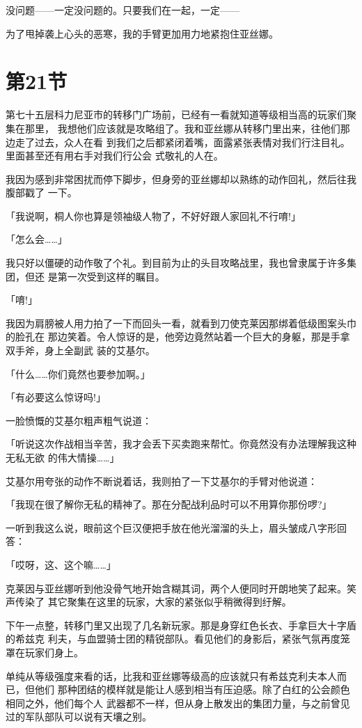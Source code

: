 \documentclass[11pt]{book}
\begin{document}
没问题——一定没问题的。只要我们在一起，一定——

为了甩掉袭上心头的恶寒，我的手臂更加用力地紧抱住亚丝娜。
\section{第21节}
\label{sec:org65d4620}
第七十五层科力尼亚市的转移门广场前，已经有一看就知道等级相当高的玩家们聚集在那里，
我想他们应该就是攻略组了。我和亚丝娜从转移门里出来，往他们那边走了过去，众人在看
到我们之后都紧闭着嘴，面露紧张表情对我们行注目礼。里面甚至还有用右手对我们行公会
式敬礼的人在。

我因为感到非常困扰而停下脚步，但身旁的亚丝娜却以熟练的动作回礼，然后往我腹部戳了
一下。

「我说啊，桐人你也算是领袖级人物了，不好好跟人家回礼不行唷!」

「怎么会……」

我只好以僵硬的动作敬了个礼。到目前为止的头目攻略战里，我也曾隶属于许多集团，但还
是第一次受到这样的瞩目。

「唷!」

我因为肩膀被人用力拍了一下而回头一看，就看到刀使克莱因那绑着低级图案头巾的脸孔在
那边笑着。令人惊讶的是，他旁边竟然站着一个巨大的身躯，那是手拿双手斧，身上全副武
装的艾基尔。

「什么……你们竟然也要参加啊。」

「有必要这么惊讶吗!」

一脸愤慨的艾基尔粗声粗气说道：

「听说这次作战相当辛苦，我才会丢下买卖跑来帮忙。你竟然没有办法理解我这种无私无欲
的伟大情操……」

艾基尔用夸张的动作不断说着话，我则拍了一下艾基尔的手臂对他说道：

「我现在很了解你无私的精神了。那在分配战利品时可以不用算你那份啰?」

一听到我这么说，眼前这个巨汉便把手放在他光溜溜的头上，眉头皱成八字形回答：

「哎呀，这、这个嘛……」

克莱因与亚丝娜听到他没骨气地开始含糊其词，两个人便同时开朗地笑了起来。笑声传染了
其它聚集在这里的玩家，大家的紧张似乎稍微得到纡解。

下午一点整，转移门里又出现了几名新玩家。那是身穿红色长衣、手拿巨大十字盾的希兹克
利夫，与血盟骑士团的精锐部队。看见他们的身影后，紧张气氛再度笼罩在玩家们身上。

单纯从等级强度来看的话，比我和亚丝娜等级高的应该就只有希兹克利夫本人而已，但他们
那种团结的模样就是能让人感到相当有压迫感。除了白红的公会颜色相同之外，他们每个人
武器都不一样，但从身上散发出的集团力量，与之前曾见过的军队部队可以说有天壤之别。
\end{document}
